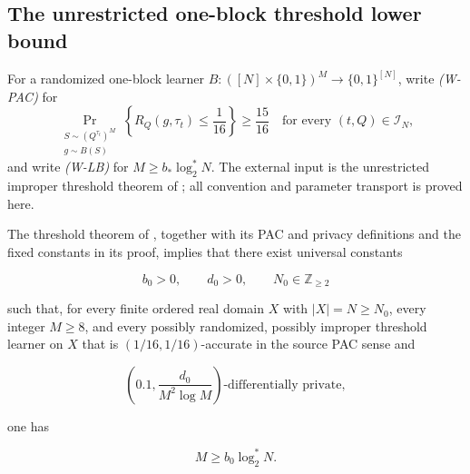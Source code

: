 \subsection{The unrestricted one-block threshold lower bound}\label{app:step-002}
For a randomized one-block learner
$B:([N]\times\{0,1\})^M\to\{0,1\}^{[N]}$, write \emph{(W-PAC)} for
\[
\Pr_{\substack{S\sim(Q^{\tau_t})^M\\g\sim B(S)}}
\left\{R_Q(g,\tau_t)\le\frac1{16}\right\}
\ge\frac{15}{16}
\quad\text{for every }(t,Q)\in\mathcal I_N,
\]
and write \emph{(W-LB)} for $M\ge b_*\log_2^*N$.  The external input is
the unrestricted improper threshold theorem of
\citet{AlonLivniMalliarisMoran2019}; all convention and parameter transport
is proved here.
\begin{lemma}\label{lem:step-002-almm-constants}
The threshold theorem of \citet[Theorem~1]{AlonLivniMalliarisMoran2019},
together with its PAC and privacy definitions and the fixed constants in its
proof, implies that there exist universal constants

\[
b_0>0,\qquad d_0>0,\qquad N_0\in\mathbb Z_{\ge2}
\]

such that, for every finite ordered real domain \(X\) with \(|X|=N\ge N_0\), every integer \(M\ge8\), and every possibly randomized, possibly improper threshold learner on \(X\) that is \((1/16,1/16)\)-accurate in the source PAC sense and

\[
\left(0.1,\frac{d_0}{M^2\log M}\right)
\text{-differentially private},
\]

one has

\[
M\ge b_0\log_2^*N.
\]
\end{lemma}

